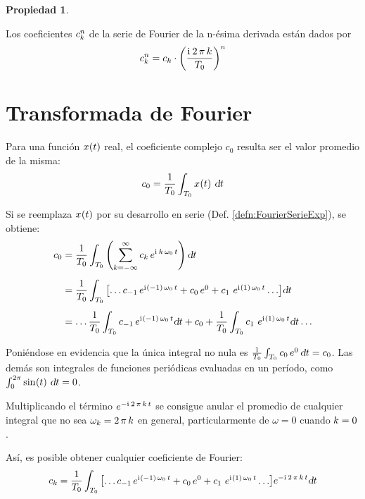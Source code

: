 \documentclass[a5paper,12pt,twoside]{book}
\newtheorem{prop}{{Propiedad}}[chapter]
\begin{document}
\begin{mdframed}[style=MyFrame1]
    \begin{prop}
    \end{prop}
    Los coeficientes $c_\kth^\nth$ de la serie de Fourier de la n-ésima derivada están dados por
    \begin{equation*}
        c_\kth^\nth = c_\kth \cdot \bb{\frac{\iu \, 2 \, \pi \, \kth}{T_0}}^\nth
    \end{equation*}
\end{mdframed}


\section{Transformada de Fourier}

Para una función $\fx[x]{t}$ real, el coeficiente complejo $c_0$ resulta ser el valor promedio de la misma:
\begin{equation*}
    c_0 = \frac{1}{T_0} \int_{T_0} \fx[x]{t} \, \dif t
\end{equation*}

Si se reemplaza $\fx[x]{t}$ por su desarrollo en serie (Def. \ref{defn:FourierSerieExp}), se obtiene:
\begin{align*}
    c_0 &= \frac{1}{T_0} \int_{T_0} \bb{\sum_{\kth=-\infty}^\infty c_\kth \, e^{\iu \, \kth \, \omega_0 \, t}} \dif t
    \\[1ex]
    &= \frac{1}{T_0} \int_{T_0} \sqb{\dots c_{-1} \, e^{\iu \bb{-1} \, \omega_0 \, t} + c_0 \, e^0 + c_1 \, \, e^{\iu \bb{1} \, \omega_0 \, t} \dots} \dif t
    \\[1ex]
    &= \dots \frac{1}{T_0} \int_{T_0} c_{-1} \, e^{\iu \bb{-1} \, \omega_0 \, t} \dif t
    + c_0
    + \frac{1}{T_0} \int_{T_0} c_1 \, \, e^{\iu \bb{1} \, \omega_0 \, t} \dif t \dots
\end{align*}

Poniéndose en evidencia que la única integral no nula es $\frac{1}{T_0} \int_{T_0} c_0 \, e^0 \, \dif t = c_0$. Las demás son integrales de funciones periódicas evaluadas en un período, como $\int_0^{2\pi} \fx[\sin]{t} \, \dif t = 0$.

Multiplicando el término $e^{-\iu \, 2 \, \pi \, \kth \, t}$ se consigue anular el promedio de cualquier integral que no sea $\omega_\kth=2 \, \pi \, \kth$ en general, particularmente de $\omega=0$ cuando $\kth=0$.

Así, es posible obtener cualquier coeficiente de Fourier:
\begin{equation*}
    \scale{0.98}{
    c_\kth = \frac{1}{T_0} \int_{T_0} \sqb{\dots c_{-1} \, e^{\iu \bb{-1} \, \omega_0 \, t} + c_0 \, e^0 + c_1 \, \, e^{\iu \bb{1} \, \omega_0 \, t} \dots} e^{-\iu \, 2 \, \pi \, \kth \, t} \dif t
    }
\end{equation*}
\end{document}
